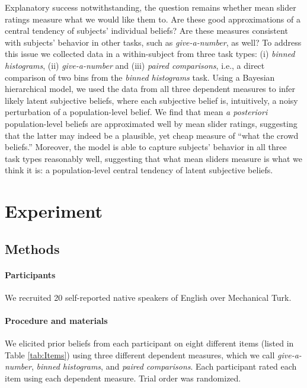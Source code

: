 \documentclass[10pt,letterpaper]{article}
\newcommand{\tableref}[1]{Table \ref{#1}}
\begin{document}
Explanatory success notwithstanding, the question remains whether mean slider ratings measure
what we would like them to. Are these good approximations of a central tendency of subjects'
individual beliefs? Are these measures consistent with subjects' behavior in other tasks, such
as \emph{give-a-number}, as well? To address this issue we collected data in a within-subject
from three task types: (i) \emph{binned histograms}, (ii) \emph{give-a-number} and (iii)
\emph{paired comparisons}, i.e., a direct comparison of two bins from the \emph{binned
  histograms} task. Using a Bayesian hierarchical model, we used the data from all three
dependent measures to infer likely latent subjective beliefs, where each subjective belief is,
intuitively, a noisy perturbation of a population-level belief. We find that mean \emph{a
  posteriori} population-level beliefs are approximated well by mean slider ratings, suggesting
that the latter may indeed be a plausible, yet cheap measure of ``what the crowd beliefs.''
Moreover, the model is able to capture subjects' behavior in all three task types reasonably
well, suggesting that what mean sliders measure is what we think it is: a population-level
central tendency of latent subjective beliefs.

\section{Experiment}

\subsection{Methods} 

\paragraph{Participants} We recruited 20 self-reported native speakers of English over Mechanical Turk.

\paragraph{Procedure and materials}

We elicited prior beliefs from each participant on eight different items (listed in \tableref{tab:Items}) using three different dependent measures, which we call \emph{give-a-number}, \emph{binned histograms}, and \emph{paired comparisons}. Each participant rated each item using each dependent measure. Trial order was randomized.
\end{document}
